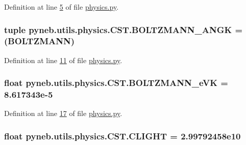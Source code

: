 Definition at line \hyperlink{physics_8py_source_l00005}{5} of file \hyperlink{physics_8py_source}{physics.\-py}.

\hypertarget{classpyneb_1_1utils_1_1physics_1_1_c_s_t_a7c0a4476149f179955c86bfdb63ade78}{
\subsubsection[{B\-O\-L\-T\-Z\-M\-A\-N\-N\-\_\-\-A\-N\-G\-K}]{\setlength{\rightskip}{0pt plus 5cm}tuple pyneb.\-utils.\-physics.\-C\-S\-T.\-B\-O\-L\-T\-Z\-M\-A\-N\-N\-\_\-\-A\-N\-G\-K = ({\bf B\-O\-L\-T\-Z\-M\-A\-N\-N})\hspace{0.3cm}{\ttfamily [static]}}}\label{classpyneb_1_1utils_1_1physics_1_1_c_s_t_a7c0a4476149f179955c86bfdb63ade78}


Definition at line \hyperlink{physics_8py_source_l00011}{11} of file \hyperlink{physics_8py_source}{physics.\-py}.

\hypertarget{classpyneb_1_1utils_1_1physics_1_1_c_s_t_aa08a3a7d69c5377fa02f0129aeec8526}{
\subsubsection[{B\-O\-L\-T\-Z\-M\-A\-N\-N\-\_\-e\-V\-K}]{\setlength{\rightskip}{0pt plus 5cm}float pyneb.\-utils.\-physics.\-C\-S\-T.\-B\-O\-L\-T\-Z\-M\-A\-N\-N\-\_\-e\-V\-K = 8.\-617343e-\/5\hspace{0.3cm}{\ttfamily [static]}}}\label{classpyneb_1_1utils_1_1physics_1_1_c_s_t_aa08a3a7d69c5377fa02f0129aeec8526}


Definition at line \hyperlink{physics_8py_source_l00017}{17} of file \hyperlink{physics_8py_source}{physics.\-py}.

\hypertarget{classpyneb_1_1utils_1_1physics_1_1_c_s_t_a316a5d8a7c983441bd40589f040f3a09}{
\subsubsection[{C\-L\-I\-G\-H\-T}]{\setlength{\rightskip}{0pt plus 5cm}float pyneb.\-utils.\-physics.\-C\-S\-T.\-C\-L\-I\-G\-H\-T = 2.\-99792458e10\hspace{0.3cm}{\ttfamily [static]}}}\label{classpyneb_1_1utils_1_1physics_1_1_c_s_t_a316a5d8a7c983441bd40589f040f3a09}


